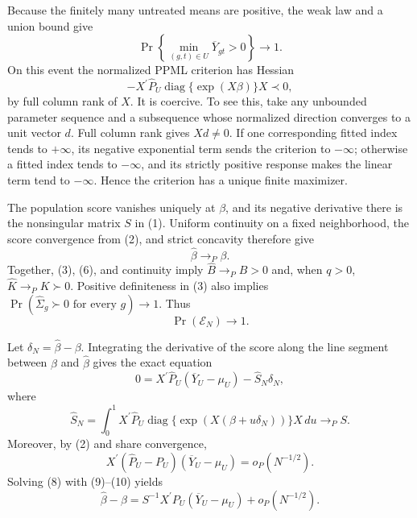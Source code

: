 Because the finitely many untreated means are positive, the weak law and a union bound give
\[
\Pr\left\{\min_{(g,t)\in U}\overline Y_{gt}>0\right\}\longrightarrow1. \tag{4}
\]
On this event the normalized PPML criterion has Hessian
\[
-X^{\prime}\widehat P_U
 \operatorname{diag}\{\exp(X\beta)\}X\prec0,                          \tag{5}
\]
by full column rank of \(X\).  It is coercive.  To see this, take any unbounded parameter sequence and a subsequence whose normalized direction converges to a unit vector \(d\).  Full column rank gives \(Xd\ne0\).  If one corresponding fitted index tends to \(+\infty\), its negative exponential term sends the criterion to \(-\infty\); otherwise a fitted index tends to \(-\infty\), and its strictly positive response makes the linear term tend to \(-\infty\).  Hence the criterion has a unique finite maximizer.

The population score vanishes uniquely at \(\beta\), and its negative derivative there is the nonsingular matrix \(S\) in (1).  Uniform continuity on a fixed neighborhood, the score convergence from (2), and strict concavity therefore give
\[
\widehat\beta\to_P\beta.                                              \tag{6}
\]
Together, (3), (6), and continuity imply
\(\widehat B\to_PB>0\) and, when \(q>0\),
\(\widehat K\to_PK\succ0\).  Positive definiteness in (3) also implies
\(\Pr(\widehat\Sigma_g\succ0\text{ for every }g)\to1\).  Thus
\[
\Pr(\mathcal E_N)\longrightarrow1.                                    \tag{7}
\]

Let \(\delta_N=\widehat\beta-\beta\).  Integrating the derivative of the score along the line segment between \(\beta\) and \(\widehat\beta\) gives the exact equation
\[
0=X^{\prime}\widehat P_U(\overline Y_U-\mu_U)-\widehat S_N\delta_N,    \tag{8}
\]
where
\[
\widehat S_N
=\int_0^1X^{\prime}\widehat P_U
 \operatorname{diag}\{\exp(X(\beta+u\delta_N))\}X\,du
\to_PS.                                                                \tag{9}
\]
Moreover, by (2) and share convergence,
\[
X^{\prime}(\widehat P_U-P_U)(\overline Y_U-\mu_U)
=o_P(N^{-1/2}).                                                         \tag{10}
\]
Solving (8) with (9)--(10) yields
\[
\widehat\beta-\beta
=S^{-1}X^{\prime}P_U(\overline Y_U-\mu_U)+o_P(N^{-1/2}).                \tag{11}
\]

